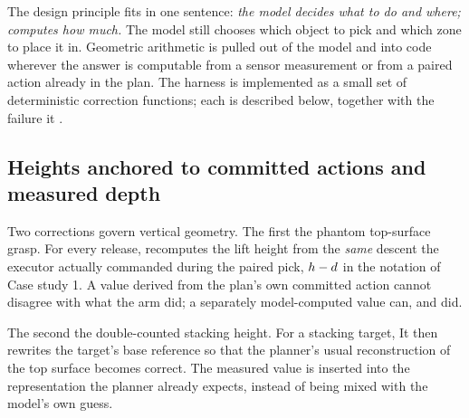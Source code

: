
The design principle fits in one sentence: \emph{the model decides
what to do and where; \harness{} computes how much.} The model still
chooses which object to pick and which zone to place it in. Geometric
arithmetic is pulled out of the model and into code wherever the
answer is computable from a sensor measurement or from a paired action
already in the plan. The harness is implemented as a small set of
deterministic correction functions; each is described below, together
with the failure it .

\subsection{Heights anchored to committed actions and measured depth}
\label{sec:fix-height}

Two corrections govern vertical geometry. The first  the
phantom top-surface grasp. For every release, \harness{} recomputes
the lift height from the \emph{same} descent the executor actually
commanded during the paired pick, $h - d$ in the notation
of Case study 1. A value derived from the plan's own committed action
cannot disagree with what the arm did; a separately model-computed
value can, and did.

The second  the double-counted stacking height. For a
stacking target,  It then rewrites the target's base reference so that the
planner's usual reconstruction of the top surface becomes correct. The
measured value is inserted into the representation the planner already
expects, instead of being mixed with the model's own guess.

